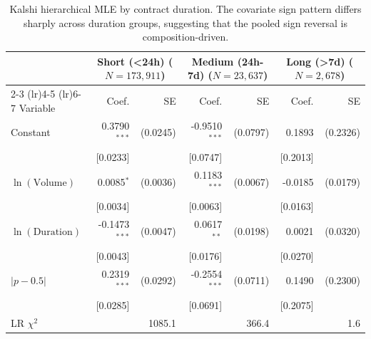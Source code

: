 \begin{table}[H]
\centering
\small
\caption{Kalshi hierarchical MLE by contract duration. The covariate sign pattern differs sharply across duration groups, suggesting that the pooled sign reversal is composition-driven.}
\label{tab:kalshi_duration_split}
\begin{tabular}{lrrrrrr}
\toprule
 & \multicolumn{2}{c}{Short (<24h) ($N=173,911$)} & \multicolumn{2}{c}{Medium (24h-7d) ($N=23,637$)} & \multicolumn{2}{c}{Long (>7d) ($N=2,678$)} \\
\cmidrule(lr){2-3} \cmidrule(lr){4-5} \cmidrule(lr){6-7} 
Variable & Coef. & SE & Coef. & SE & Coef. & SE \\
\midrule
Constant & 0.3790$^{***}$ & (0.0245) & -0.9510$^{***}$ & (0.0797) & 0.1893 & (0.2326) \\
  & [0.0233] &  & [0.0747] &  & [0.2013] &  \\
$\ln(\text{Volume})$ & 0.0085$^{*}$ & (0.0036) & 0.1183$^{***}$ & (0.0067) & -0.0185 & (0.0179) \\
  & [0.0034] &  & [0.0063] &  & [0.0163] &  \\
$\ln(\text{Duration})$ & -0.1473$^{***}$ & (0.0047) & 0.0617$^{**}$ & (0.0198) & 0.0021 & (0.0320) \\
  & [0.0043] &  & [0.0176] &  & [0.0270] &  \\
$|p - 0.5|$ & 0.2319$^{***}$ & (0.0292) & -0.2554$^{***}$ & (0.0711) & 0.1490 & (0.2300) \\
  & [0.0285] &  & [0.0691] &  & [0.2075] &  \\
\midrule
LR $\chi^2$ & \multicolumn{2}{r}{1085.1} & \multicolumn{2}{r}{366.4} & \multicolumn{2}{r}{1.6} \\
\bottomrule
\end{tabular}
\end{table}